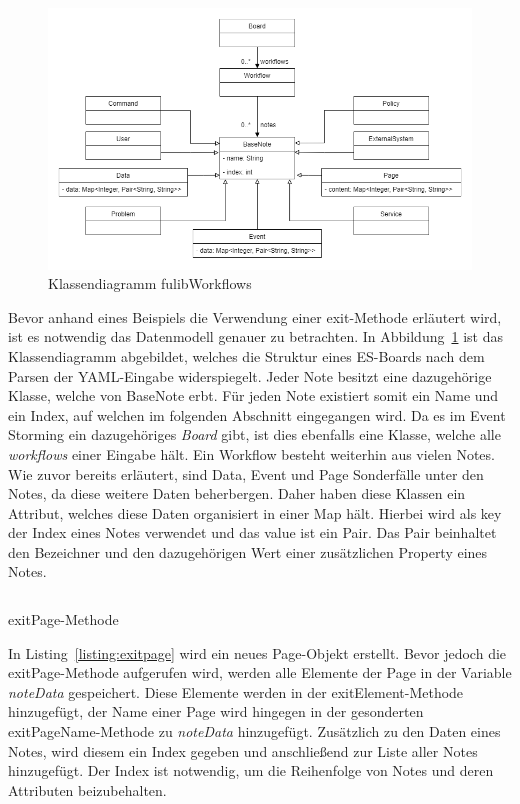 \begin{figure}[h]
    \centering
    \includegraphics[width=1\textwidth]{images/3.1/classdiagram.drawio}
    \caption{Klassendiagramm fulibWorkflows}
    \label{fig:classdiagram}
\end{figure}

Bevor anhand eines Beispiels die Verwendung einer exit-Methode erläutert wird, ist es notwendig das Datenmodell genauer zu betrachten.
In Abbildung~\ref{fig:classdiagram} ist das Klassendiagramm abgebildet, welches die Struktur eines \ac{ES}-Boards nach dem Parsen der YAML-Eingabe widerspiegelt.
Jeder Note besitzt eine dazugehörige Klasse, welche von BaseNote erbt.
Für jeden Note existiert somit ein Name und ein Index, auf welchen im folgenden Abschnitt eingegangen wird.
Da es im Event Storming ein dazugehöriges \textit{Board} gibt, ist dies ebenfalls eine Klasse, welche alle \textit{workflows} einer Eingabe hält.
Ein Workflow besteht weiterhin aus vielen Notes.
Wie zuvor bereits erläutert, sind Data, Event und Page Sonderfälle unter den Notes, da diese weitere Daten beherbergen.
Daher haben diese Klassen ein Attribut, welches diese Daten organisiert in einer Map hält.
Hierbei wird als key der Index eines Notes verwendet und das value ist ein Pair.
Das Pair beinhaltet den Bezeichner und den dazugehörigen Wert einer zusätzlichen Property eines Notes.

\begin{listing}[!ht]
    \inputminted[firstnumber=106]{java}{listings/3.1.3/ExitPage.java}
    \caption{exitPage-Methode}
    \label{listing:exitpage}
\end{listing}

In Listing~\ref{listing:exitpage} wird ein neues Page-Objekt erstellt.
Bevor jedoch die exitPage-Methode aufgerufen wird, werden alle Elemente der Page in der Variable \textit{noteData} gespeichert.
Diese Elemente werden in der exitElement-Methode hinzugefügt, der Name einer Page wird hingegen in der gesonderten exitPageName-Methode zu \textit{noteData} hinzugefügt.
Zusätzlich zu den Daten eines Notes, wird diesem ein Index gegeben und anschließend zur Liste aller Notes hinzugefügt.
Der Index ist notwendig, um die Reihenfolge von Notes und deren Attributen beizubehalten.
